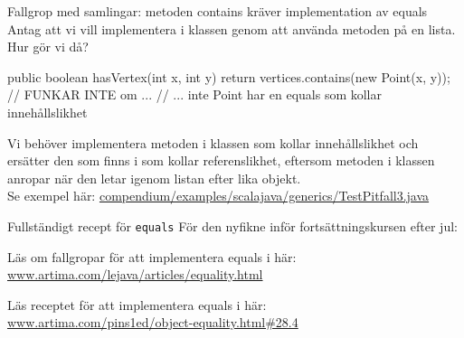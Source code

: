 \begin{Slide}{Fallgrop med samlingar: metoden contains kräver implementation av equals}\SlideFontSmall
Antag att vi vill implementera  i klassen  genom att använda metoden  på en lista. Hur gör vi då?
\pause
\begin{Code}[numberstyle=,language=Java]
public boolean hasVertex(int x, int y) {
    return vertices.contains(new Point(x, y)); // FUNKAR INTE om ...
    // ... inte Point har en equals som kollar innehållslikhet
}
\end{Code}
Vi behöver implementera metoden  i klassen  som kollar innehållslikhet och ersätter den  som finns i  som kollar referenslikhet, eftersom metoden  i klassen  anropar  när den letar igenom listan efter lika objekt. \\
Se exempel här: \href{https://github.com/lunduniversity/introprog/tree/master/compendium/examples/scalajava/generics/TestPitfall3.java}{compendium/examples/scalajava/generics/TestPitfall3.java} \\


\end{Slide}


\begin{Slide}{Fullständigt recept för \texttt{equals}}
För den nyfikne inför fortsättningskursen efter jul: 

\vspace{1em}\noindent
Läs om fallgropar för att implementera equals i  här: \\
\href{http://www.artima.com/lejava/articles/equality.html}{www.artima.com/lejava/articles/equality.html}


\vspace{1em}\noindent
Läs receptet för att implementera equals i  här: \\
\href{http://www.artima.com/pins1ed/object-equality.html#28.4}{www.artima.com/pins1ed/object-equality.html\#28.4}
\end{Slide}





